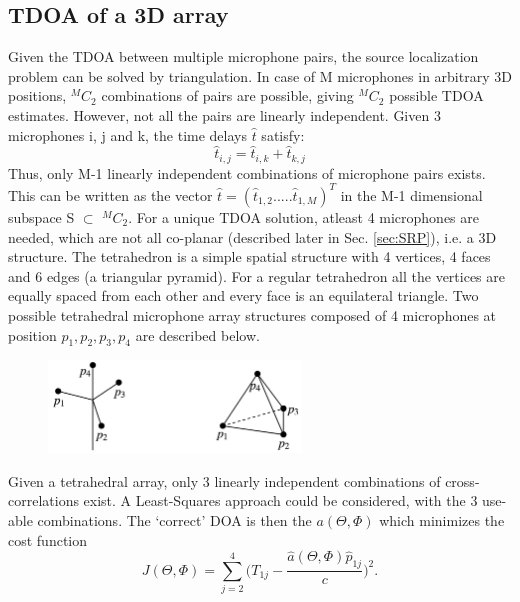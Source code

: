 \subsection{TDOA of a 3D array}\label{sec:TDOAN}
Given the TDOA between multiple microphone pairs, the source localization problem can be solved by triangulation. In case of M microphones in arbitrary 3D positions, $^MC_2$ combinations of pairs are possible, giving $^MC_2$ possible TDOA estimates. However, not all the pairs are linearly independent. Given 3 microphones i, j and k, the time delays $\hat{t}$ satisfy:
\begin{equation}
    \hat{t}_{i,j}=\hat{t}_{i,k}+\hat{t}_{k,j}
    \label{Eq:linearDep}
\end{equation}
Thus, only M-1 linearly independent combinations of microphone pairs exists. This can be written as the vector $\hat{t}=(\hat{t}_{1,2}.....\hat{t}_{1,M})^T$ in the M-1 dimensional subspace S $\subset$ $^MC_2$. For a unique TDOA solution, atleast 4 microphones are needed, which are not all co-planar (described later in Sec. \ref{sec:SRP}), i.e. a 3D structure. The tetrahedron is a simple spatial structure with 4 vertices, 4 faces and 6 edges (a triangular pyramid). For a regular tetrahedron all the vertices are equally spaced from each other and every face is an equilateral triangle. Two possible tetrahedral microphone array structures composed of 4 microphones at position $p_1, p_2, p_3, p_4$ are described below.
\begin{figure}[H]
    \centering
    \includegraphics[width=0.6\textwidth]{Figures/arrayex.png}
    \label{fig:arrayex}
\end{figure}
Given a tetrahedral array, only 3 linearly independent combinations of cross-correlations exist. A Least-Squares approach could be considered, with the 3 use-able combinations. The `correct' DOA is then the $a(\Theta,\Phi)$ which minimizes the cost function
\begin{equation}
    J(\Theta,\Phi) = \sum\limits_{j=2}^4\bigg(T_{1j}-\frac{\hat{a}(\Theta,\Phi)\hat{p}_{1j}}{c}\bigg)^2.
    \label{Eq:linearDepSol}
\end{equation}



